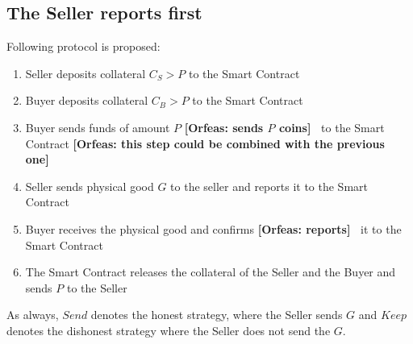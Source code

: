 \documentclass{cacthesis}
\newcommand{\authnote}[3]{{ \footnotesize \textbf{#1[#2: #3]~}}}
\newcommand{\orfnote}[1]{\authnote{\color{blue}}{Orfeas}{#1}}
\begin{document}
\subsection{The Seller reports first}
Following protocol is proposed:
\begin{enumerate}
    \item Seller deposits collateral $C_S > P$ to the Smart Contract
    \item Buyer deposits collateral $C_B > P$ to the Smart Contract
    \item Buyer sends funds of amount $P$ \orfnote{sends $P$ coins} to the Smart
    Contract \orfnote{this step could be combined with the previous one}
    \item Seller sends physical good $G$ to the seller and reports it to the Smart Contract
    \item Buyer receives the physical good and confirms \orfnote{reports} it to the Smart Contract
    \item The Smart Contract releases the collateral of the Seller and the Buyer and sends $P$ to the Seller
\end{enumerate}
As always, $Send$ denotes the honest strategy, where the Seller sends $G$ and $Keep$ denotes the dishonest strategy where the Seller does not send the $G$.
\end{document}
